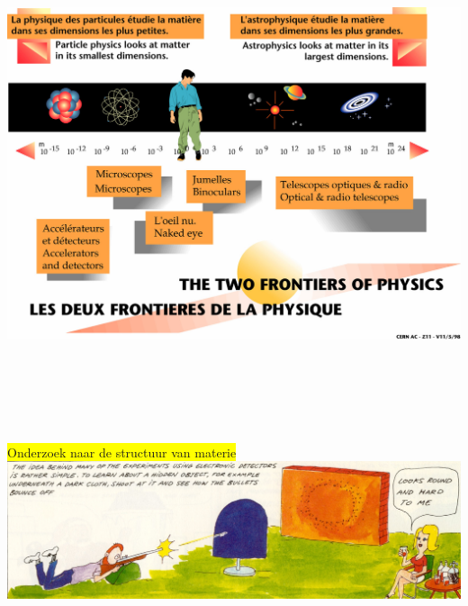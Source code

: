 \onecolumn
\begin{center}
\includegraphics[keepaspectratio,height=14.9cm]{frontiers}
\end{center}

\Tr
\onecolumn
\vspace*{1cm}
\begin{center}
\colorbox{yellow}{Onderzoek naar de structuur van materie}\\[1cm]
\includegraphics[keepaspectratio,width=25cm]{scatter}
\end{center}

